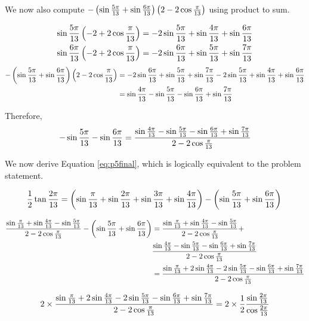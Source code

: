 \documentclass[10pt]{../usamts}
\begin{document}
\begin{solution}{5}
We now also compute $-\left( \sin{{\frac{5\pi}{13}}} + \sin{{\frac{6\pi}{13}}} \right)\left( 2 - 2\cos{{\frac{\pi}{13}}} \right)$ using product to sum.

\begin{align*}
    \sin{{\frac{5\pi}{13}}}\left( -2 + 2\cos{{\frac{\pi}{13}}} \right) &= -2\sin{{\frac{5\pi}{13}}} + \sin{{\frac{4\pi}{13}}} + \sin{{\frac{6\pi}{13}}} \\
    \sin{{\frac{6\pi}{13}}}\left( -2 + 2\cos{{\frac{\pi}{13}}} \right) &= -2\sin{{\frac{6\pi}{13}}} + \sin{{\frac{5\pi}{13}}} + \sin{{\frac{7\pi}{13}}}
\end{align*}
\begin{align*}
    -\left( \sin{{\frac{5\pi}{13}}} + \sin{{\frac{6\pi}{13}}} \right)\left( 2 - 2\cos{{\frac{\pi}{13}}} \right)
    &= -2\sin{{\frac{6\pi}{13}}} + \sin{{\frac{5\pi}{13}}} + \sin{{\frac{7\pi}{13}}} -2\sin{{\frac{5\pi}{13}}} + \sin{{\frac{4\pi}{13}}} + \sin{{\frac{6\pi}{13}}} \\
    &= \sin{{\frac{4\pi}{13}}} - \sin{{\frac{5\pi}{13}}} -\sin{{\frac{6\pi}{13}}} + \sin{{\frac{7\pi}{13}}}
\end{align*}

Therefore,
\[
-\sin{{\frac{5\pi}{13}}} -\sin{{\frac{6\pi}{13}}} = \frac{\sin{{\frac{4\pi}{13}}} - \sin{{\frac{5\pi}{13}}} -\sin{{\frac{6\pi}{13}}} + \sin{{\frac{7\pi}{13}}}}{2 - 2 \cos{{\frac{\pi}{13}}}}
\]

We now derive Equation \ref{eq:p5final}, which is logically equivalent to the problem statement.

\begin{equation*}
    \frac{1}{2} \tan{{\frac{2\pi}{13}}} = \left( \sin{{\frac{\pi}{13}}} + \sin{{\frac{2\pi}{13}}} + \sin{{\frac{3\pi}{13}}} + \sin{{\frac{4\pi}{13}}} \right) - \left( \sin{{\frac{5\pi}{13}}} + \sin{{\frac{6\pi}{13}}} \right) \\
\end{equation*}

\begin{align*}
    \frac{\sin{{\frac{\pi}{13}}} + \sin{{\frac{4\pi}{13}}} - \sin{{\frac{5\pi}{13}}}} {2 - 2\cos{{\frac{\pi}{13}}}}
    -\left( \sin{{\frac{5\pi}{13}}} + \sin{{\frac{6\pi}{13}}} \right)
    &= \frac{\sin{{\frac{\pi}{13}}} + \sin{{\frac{4\pi}{13}}} - \sin{{\frac{5\pi}{13}}}} {2 - 2\cos{{\frac{\pi}{13}}}} +\\
    & \frac{\sin{{\frac{4\pi}{13}}} - \sin{{\frac{5\pi}{13}}} -\sin{{\frac{6\pi}{13}}} + \sin{{\frac{7\pi}{13}}}} {2 - 2\cos{{\frac{\pi}{13}}}} \\
    &= \frac{\sin{{\frac{\pi}{13}}} + 2\sin{{\frac{4\pi}{13}}} - 2\sin{{\frac{5\pi}{13}}} - \sin{{\frac{6\pi}{13}}} + \sin{{\frac{7\pi}{13}}}} {2 - 2\cos{{\frac{\pi}{13}}}} \\
\end{align*}

\begin{equation*}
    2 \times \frac{\sin{{\frac{\pi}{13}}} + 2\sin{{\frac{4\pi}{13}}} - 2\sin{{\frac{5\pi}{13}}} - \sin{{\frac{6\pi}{13}}} + \sin{{\frac{7\pi}{13}}}} {2 - 2\cos{{\frac{\pi}{13}}}}
    = 2 \times \frac{1}{2} \frac{\sin{{\frac{2\pi}{13}}}}{\cos{{\frac{2\pi}{13}}}} \\
\end{equation*}


\end{solution}
\end{document}
